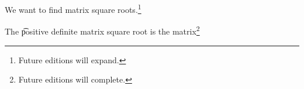 

We want to find matrix square roots.\footnote{Future editions will expand.}


The \t{positive definite matrix square root} is the matrix\footnote{Future editions will complete.}

\blankpage
